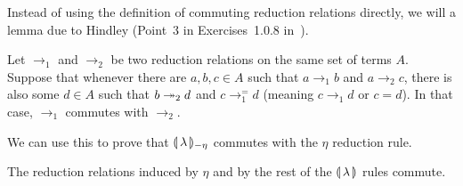 Instead of using the definition of commuting reduction relations directly,
we will a lemma due to Hindley (Point~3 in Exercises~1.0.8
in~\cite{klop1992term}).

\begin{lemma}\label{lem:commutativity}
  Let $\to_1$ and $\to_2$ be two reduction relations on the same set of
  terms $A$. Suppose that whenever there are $a,b,c \in A$ such that
  $a \to_1 b$ and $a \to_2 c$, there is also some $d \in A$ such that
  $b \twoheadrightarrow_2 d$ and $c \to_1^= d$ (meaning $c \to_1 d$ or $c = d$). In that
  case, $\to_1$ commutes with $\to_2$.
\end{lemma}

We can use this to prove that $\llparenthesis \, \lambda \, \rrparenthesis_{-\eta}$ commutes with the
$\eta$ reduction rule.

\begin{lemma}\label{lem:eta-commutes}

  The reduction relations induced by $\eta$ and by the rest of the
  $\llparenthesis \, \lambda \, \rrparenthesis$ rules commute.
\end{lemma}

